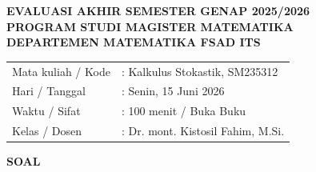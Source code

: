 \documentclass[11pt,a4paper]{article}
\begin{document}

\begin{center}
  {\Large \textbf{EVALUASI AKHIR SEMESTER GENAP 2025/2026}}\\
  {\Large \textbf{PROGRAM STUDI MAGISTER MATEMATIKA}}\\
  {\Large \textbf{DEPARTEMEN MATEMATIKA FSAD ITS}}
\end{center}

\vspace{0.4cm}

\begin{tabular}{@{}ll@{}}
  Mata kuliah / Kode & : Kalkulus Stokastik, SM235312 \\
  Hari / Tanggal     & : Senin, 15 Juni 2026 \\
  Waktu / Sifat      & : 100 menit / Buka Buku \\
  Kelas / Dosen      & : Dr. mont. Kistosil Fahim, M.Si.
\end{tabular}

\vspace{0.6cm}

\begin{center}
  \textbf{SOAL}
\end{center}
\end{document}
